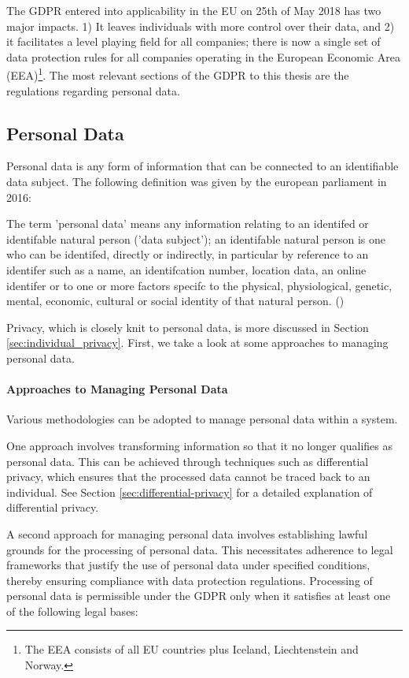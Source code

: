 The GDPR entered into applicability in the EU on 25th of May 2018 has two major impacts. 1) It leaves individuals with more control over their data, and 2) it facilitates a level playing field for all companies; there is now a single set of data protection rules for all companies operating in the European Economic Area (EEA)\footnote{The EEA consists of all EU countries plus Iceland, Liechtenstein and Norway.}. The most relevant sections of the GDPR to this thesis are the regulations regarding personal data.

\subsection{Personal Data}
\label{sec:personal_data}
Personal data is any form of information that can be connected to an identifiable data subject. The following definition was given by the european parliament in 2016:

\begin{myquote}
    The term 'personal data' means any information relating to an identifed or identifable natural person ('data subject'); an identifable natural person is one who can be identifed, directly or indirectly, in particular by reference to an identifer such as a name, an identifcation number, location data, an online identifer or to one or more factors specifc to the physical, physiological, genetic, mental, economic, cultural or social identity of that natural person. (\cite{in2023gdpr_website})
\end{myquote}

Privacy, which is closely knit to personal data, is more discussed in Section \ref{sec:individual_privacy}. First, we take a look at some approaches to managing personal data. 

\newpage
\paragraph{Approaches to Managing Personal Data}
Various methodologies can be adopted to manage personal data within a system. 

One approach involves transforming information so that it no longer qualifies as personal data. This can be achieved through techniques such as differential privacy, which ensures that the processed data cannot be traced back to an individual. See Section \ref{sec:differential-privacy} for a detailed explanation of differential privacy. 

A second approach for managing personal data involves establishing lawful grounds for the processing of personal data. This necessitates adherence to legal frameworks that justify the use of personal data under specified conditions, thereby ensuring compliance with data protection regulations. Processing of personal data is permissible under the GDPR only when it satisfies at least one of the following legal bases:

